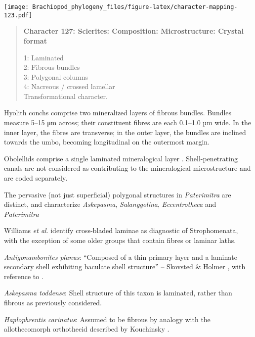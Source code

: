 \documentclass[openany]{book}
\theoremstyle{definition}
\theoremstyle{definition}
\theoremstyle{definition}
\theoremstyle{remark}
\begin{document}
\texttt{[image: Brachiopod\_phylogeny\_files/figure-latex/character-mapping-123.pdf]}

\begin{quote}
\textbf{Character 127: Sclerites: Composition: Microstructure: Crystal
format}

1: Laminated\\
2: Fibrous bundles\\
3: Polygonal columns\\
4: Nacreous / crossed lamellar\\
Transformational character.
\end{quote}

Hyolith conchs comprise two mineralized layers of fibrous bundles.
Bundles measure 5--15 μm across; their constituent fibres are each
0.1--1.0 µm wide. In the inner layer, the fibres are transverse; in the
outer layer, the bundles are inclined towards the umbo, becoming
longitudinal on the outermost margin.

Obolellids comprise a single laminated mineralogical layer
\citep{Balthasar2008iMummpikia}. Shell-penetrating canals are not
considered as contributing to the mineralogical microstructure and are
coded separately.

The pervasive (not just superficial) polygonal structures in
\emph{Paterimitra} are distinct, and characterize \emph{Askepasma},
\emph{Salanygolina}, \emph{Eccentrotheca} and \emph{Paterimitra}
\citep{Larsson2014iPaterimitra}

Williams \emph{et al}.
\citeyearpar{Williams2000LinguliformeaCraniiformea} identify
cross-bladed laminae as diagnostic of Strophomenata, with the exception
of some older groups that contain fibres or laminar laths.

\hypertarget{Antigonambonites_planus-coding-127}{}
\emph{Antigonambonites planus}: ``Composed of a thin primary layer and a
laminate secondary shell exhibiting baculate shell structure'' --
Skovsted \& Holmer \citeyearpar{Skovsted2005EarlyCambrian}, with
reference to \citet{Skovsted2003EarlyCambrian}.

\hypertarget{Askepasma_toddense-coding-127}{}
\emph{Askepasma toddense}: Shell structure of this taxon is laminated,
rather than fibrous as previously considered.

\hypertarget{Haplophrentis_carinatus-coding-127}{}
\emph{Haplophrentis carinatus}: Assumed to be fibrous by analogy with
the allothecomorph orthothecid described by Kouchinsky
\citeyearpar{Kouchinsky2000Skeletalmicrostructures}.
\end{document}
